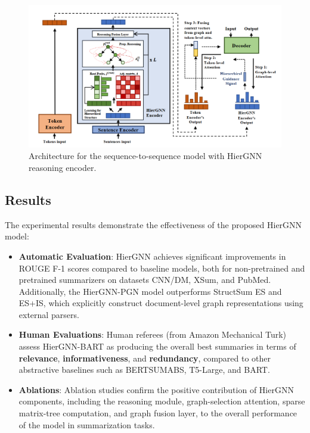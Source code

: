 \documentclass{article}
\begin{document}
\begin{figure}[h]
  \centering
  \includegraphics[width=1\textwidth]{Model.png}
  \caption{Architecture for the sequence-to-sequence model with HierGNN reasoning encoder.}
  \label{fig:model_diagram}
\end{figure}

\pagebreak

\subsection{Results}
The experimental results demonstrate the effectiveness of the proposed HierGNN model:
\begin{itemize}
    \item \textbf{Automatic Evaluation}: HierGNN achieves significant improvements in ROUGE F-1 scores compared to baseline models, both for non-pretrained and pretrained summarizers on datasets CNN/DM, XSum, and PubMed. Additionally, the HierGNN-PGN model outperforms StructSum ES and ES+IS, which explicitly construct document-level graph representations using external parsers.
    \item \textbf{Human Evaluations}: Human referees (from Amazon Mechanical Turk) assess HierGNN-BART as producing the overall best summaries in terms of \textbf{relevance}, \textbf{informativeness}, and \textbf{redundancy}, compared to other abstractive baselines such as BERTSUMABS, T5-Large, and BART.
    \item \textbf{Ablations}: Ablation studies confirm the positive contribution of HierGNN components, including the reasoning module, graph-selection attention, sparse matrix-tree computation, and graph fusion layer, to the overall performance of the model in summarization tasks.
\end{itemize}
\end{document}
